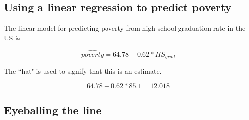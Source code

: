 
\subsection{Using a linear regression to predict poverty}


\begin{frame}

The linear model for predicting poverty from high school graduation rate in the US is

\[ \hat{poverty} = 64.78 - 0.62 * HS_{grad} \]

The ``hat" is used to signify that this is an estimate.

\end{frame}


\begin{frame}


\pause

\[ 64.78 - 0.62 * 85.1 = 12.018 \]

\end{frame}


\subsection{Eyeballing the line}



